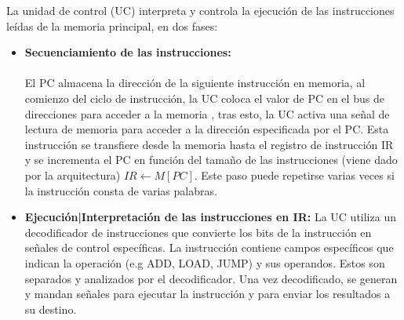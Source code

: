 La unidad de control (UC) interpreta y controla la ejecución de las instrucciones leídas de la memoria principal, en dos fases:
\begin{itemize}
	\item \textbf{Secuenciamiento de las instrucciones:}
	      \\ \\ El PC almacena la dirección de la siguiente instrucción en memoria, al comienzo del ciclo de instrucción, la UC coloca el valor de PC en el bus de direcciones para acceder a la memoria
	      , tras esto, la UC activa una señal de lectura de memoria para acceder a la dirección especificada por el PC. Esta instrucción se transfiere desde la memoria hasta el registro de instrucción IR y se incrementa el PC en función del tamaño de las instrucciones (viene dado por la arquitectura)
	      $ IR \leftarrow M[PC]$. Este paso puede repetirse varias veces si la instrucción consta de varias palabras.
	\item \textbf{Ejecución|Interpretación de las instrucciones en IR:}
	      La UC utiliza un decodificador de instrucciones que convierte los bits de la instrucción en señales de control específicas. La instrucción contiene
	      campos específicos que indican la operación (e.g ADD, LOAD, JUMP) y sus operandos. Estos son separados y analizados por el decodificador.
	      Una vez decodificado, se generan y mandan señales para ejecutar la instrucción y para enviar los resultados a su destino.
\end{itemize}

